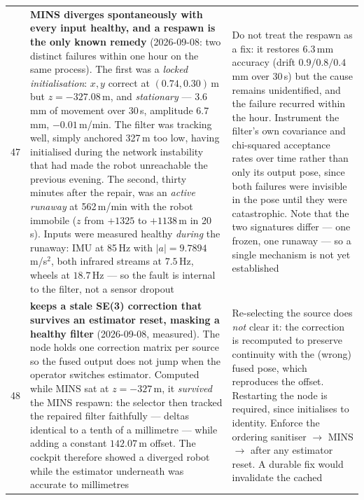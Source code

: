 \begin{longtable}{@{}cL{6.2cm}L{6.8cm}@{}}
47 & \textbf{MINS diverges spontaneously with every input healthy, and a
    respawn is the only known remedy} (2026-09-08: two distinct failures
    within one hour on the same process). The first was a \emph{locked
    initialisation}: $x,y$ correct at $(0.74, 0.30)$\,m but $z = -327.08$\,m,
    and \emph{stationary} --- $3.6$\,mm of movement over 30\,s, amplitude
    $6.7$\,mm, $-0.01$\,m/min. The filter was tracking well, simply anchored
    327\,m too low, having initialised during the network instability that
    had made the robot unreachable the previous evening. The second, thirty
    minutes after the repair, was an \emph{active runaway} at 562\,m/min with
    the robot immobile ($z$ from $+1325$ to $+1138$\,m in 20\,s). Inputs were
    measured healthy \emph{during} the runaway: IMU at 85\,Hz with
    $|a| = 9.7894$\,m/s$^2$, both infrared streams at $7.5$\,Hz, wheels at
    $18.7$\,Hz --- so the fault is internal to the filter, not a sensor
    dropout &
    Do not treat the respawn as a fix: it restores $6.3$\,mm accuracy
    (drift $0.9/0.8/0.4$\,mm over 30\,s) but the cause remains unidentified,
    and the failure recurred within the hour. Instrument the filter's own
    covariance and chi-squared acceptance rates over time rather than only
    its output pose, since both failures were invisible in the pose until
    they were catastrophic. Note that the two signatures differ --- one
    frozen, one runaway --- so a single mechanism is not yet established \\
48 & \textbf{ keeps a stale SE(3) correction that
    survives an estimator reset, masking a healthy filter}
    (2026-09-08, measured). The node holds one correction matrix per source
    so the fused output does not jump when the operator switches estimator.
    Computed while MINS sat at $z=-327$\,m, it \emph{survived} the MINS
    respawn: the selector then tracked the repaired filter faithfully ---
    deltas identical to a tenth of a millimetre --- while adding a constant
    $142.07$\,m offset. The cockpit therefore showed a diverged robot while
    the estimator underneath was accurate to millimetres &
    Re-selecting the source does \emph{not} clear it: the correction is
    recomputed to preserve continuity with the (wrong) fused pose, which
    reproduces the offset. Restarting the node is required, since
     initialises to identity. Enforce the ordering
    sanitiser $\rightarrow$ MINS $\rightarrow$  after
    any estimator reset. A durable fix would invalidate the cached

\end{longtable}
